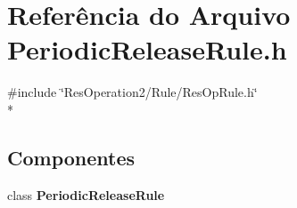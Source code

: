 \section{Referência do Arquivo Periodic\+Release\+Rule.\+h}
\label{_2_rule_2_periodic_release_2_periodic_release_rule_8h}
{\ttfamily \#include \char`\"{}Res\+Operation2/\+Rule/\+Res\+Op\+Rule.\+h\char`\"{}}\\*
\subsection*{Componentes}
\begin{DoxyCompactItemize}
\item 
class {\bf Periodic\+Release\+Rule}
\end{DoxyCompactItemize}
